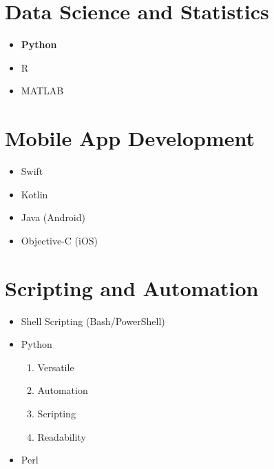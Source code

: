 \documentclass{article}
\begin{document}
\section{Data Science and Statistics}

\begin{itemize}
    \item \textbf {Python}
    \item R
    \item MATLAB
\end{itemize}

\section{Mobile App Development}

\begin{itemize}
    \item Swift
    \item Kotlin
    \item Java (Android)
    \item Objective-C (iOS)
\end{itemize}

\section{Scripting and Automation}

\begin{itemize}
    \item Shell Scripting (Bash/PowerShell)
    \item Python
    \begin{enumerate}[label=\alph*.]
        \item Versatile
        \item Automation
        \item Scripting
        \item Readability
    \end{enumerate}
    \item Perl
\end{itemize}
\end{document}
